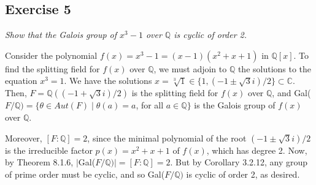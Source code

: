 \subsection*{Exercise 5}
\textit{Show that the Galois group of $x^3 - 1$ over $\mathbb{Q}$ is cyclic of order 2.}

\vspace{5 mm}
Consider the polynomial $f(x) = x^3 - 1 = (x-1)(x^2 + x + 1)$ in $\mathbb{Q}[x]$. To find the splitting field for $f(x)$ over $\mathbb{Q}$, we must adjoin to $\mathbb{Q}$ the solutions to the equation $x^3 = 1$. We have the solutions $x = \sqrt[3]{1} \in \{1,(-1\pm\sqrt{3}i)/2 \} \subset \mathbb{C}$. Then, $F = \mathbb{Q}((-1+\sqrt{3}i)/2)$ is the splitting field for $f(x)$ over $\mathbb{Q}$, and Gal($F/\mathbb{Q}) = \{ \theta \in Aut(F) \mid \theta(a) = a$, for all $a \in \mathbb{Q} \}$ is the Galois group of $f(x)$ over $\mathbb{Q}$.

Moreover, $[F:\mathbb{Q}] = 2$, since the minimal polynomial of the root $(-1\pm\sqrt{3}i)/2$ is the irreducible factor $p(x) = x^2 + x + 1$ of $f(x)$, which has degree 2. Now, by Theorem 8.1.6, $|$Gal($F/\mathbb{Q})| = [F:\mathbb{Q}] = 2$. But by Corollary 3.2.12, any group of prime order must be cyclic, and so Gal($F/\mathbb{Q})$ is cyclic of order 2, as desired.